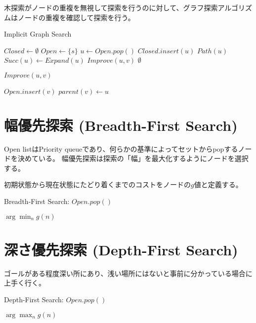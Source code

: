 \documentclass{book}
\begin{document}
木探索がノードの重複を無視して探索を行うのに対して、グラフ探索アルゴリズムはノードの重複を確認して探索を行う。

\begin{algorithm}
\caption{Implicit Graph Search}
\label{alg:implicit-graph-search}
	$Closed \leftarrow \emptyset$\;
	$Open \leftarrow \{s\}$\;
	 {
		$u \leftarrow Open.pop()$\;
		$Closed.insert(u)$\;
		 {
			\Return $Path(u)$\;
		}
		$Succ(u) \leftarrow Expand(u)$\;
		 {
			$Improve(u, v)$\;
		}
 	}
	\Return $\emptyset$\;
\end{algorithm}

\begin{algorithm}
\caption{$Improve(u,v)$}
\label{alg:improve}
	 {
		$Open.insert(v)$\;
		$parent(v) \leftarrow u$\;
	}
\end{algorithm}

\section{幅優先探索 (Breadth-First Search)}
\label{sec:breadth-first-search}

Open listはPriority queueであり、何らかの基準によってセットからpopするノードを決めている。
幅優先探索は探索の「幅」を最大化するようにノードを選択する。

初期状態から現在状態にたどり着くまでのコストをノードの$g$値と定義する。

\begin{algorithm}
\caption{Breadth-First Search: $Open.pop()$}
\label{alg:brfs-open}
	\Return $\arg \min_n g(n)$
\end{algorithm}

\section{深さ優先探索 (Depth-First Search)}
\label{sec:depth-first-search}

ゴールがある程度深い所にあり、浅い場所にはないと事前に分かっている場合に上手く行く。


\begin{algorithm}
\caption{Depth-First Search: $Open.pop()$}
\label{alg:dfs-open}
	\Return $\arg \max_n g(n)$
\end{algorithm}
\end{document}
